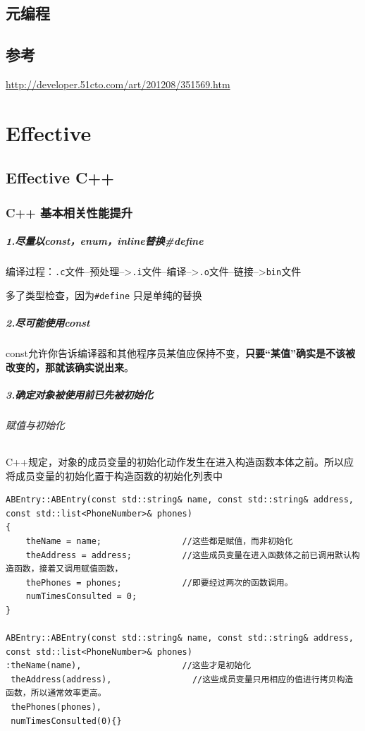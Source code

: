 \documentclass[UTF8,a4paper,12pt]{ctexbook}
\begin{document}
\section{元编程}
	
	
	
\section{参考}\url{http://developer.51cto.com/art/201208/351569.htm}    

\chapter{Effective}
	\section{Effective C++}
		\subsection{C++ 基本相关性能提升}
		\paragraph{1.尽量以const，enum，inline替换\#define} 编译过程：\verb|.c|文件--预处理-->\verb|.i|文件--编译-->\verb|.o|文件--链接-->\verb|bin|文件
		
		多了类型检查，因为\verb|#define| 只是单纯的替换
		\paragraph{2.尽可能使用const} const允许你告诉编译器和其他程序员某值应保持不变，\textbf{只要“某值”确实是不该被改变的，那就该确实说出来}。
		\paragraph{3.确定对象被使用前已先被初始化}
			\subparagraph{赋值与初始化} C++规定，对象的成员变量的初始化动作发生在进入构造函数本体之前。所以应将成员变量的初始化置于构造函数的初始化列表中
			
			\begin{lstlisting}
ABEntry::ABEntry(const std::string& name, const std::string& address,
const std::list<PhoneNumber>& phones)
{ 
	theName = name;                //这些都是赋值，而非初始化
	theAddress = address;          //这些成员变量在进入函数体之前已调用默认构造函数，接着又调用赋值函数，
	thePhones = phones;            //即要经过两次的函数调用。            
	numTimesConsulted = 0;
} 
	 
ABEntry::ABEntry(const std::string& name, const std::string& address,
const std::list<PhoneNumber>& phones) 
:theName(name),                    //这些才是初始化 
 theAddress(address),                //这些成员变量只用相应的值进行拷贝构造函数，所以通常效率更高。
 thePhones(phones),
 numTimesConsulted(0){} 
			\end{lstlisting}
				
\end{document}
